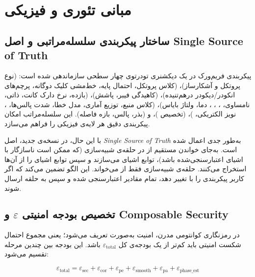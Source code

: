 \section{مبانی تئوری و فیزیکی}

\subsection{ساختار پیکربندی سلسله‌مراتبی و اصل Single Source of Truth}

پیکربندی فریم‌ورک در یک دیکشنری تودرتوی چهار سطحی سازماندهی شده است:  (نوع پروتکل و آشکارساز)،  (کلاس پروتکل، احتمال پایه، خط‌مشی کلیک دوگانه، پرچم‌های انکودر/دیکودر درهم‌تنیده)،  (کاهیدگی فیبر، پاشش)،  (بازده، نرخ دارک کانت،  ذاتی، نامساوی، ، ، ، دما، ولتاژ بایاس)،  (کلاس منبع، توزیع آماری، مدل خطا، شدت پالس‌ها، ، نویز الکتریکی، )،  (تخصیص )، و  (بذر،  پالس، بازه فاصله). این سلسله‌مراتب امکان پیکربندی دقیق هر لایه‌ی فیزیکی را فراهم می‌سازد.

با این حال، در نسخه‌ی جدید، اصل \emph{Single Source of Truth} به‌طور جدی اعمال شده است. به‌جای خواندن مستقیم از  در حلقه‌ی شبیه‌سازی (که ممکن است ناسازگار با اشیای اعتبارسنجی‌شده باشد)، توابع  اشیای  می‌سازند و سپس توابع  اشیای   را از آن‌ها استخراج می‌کنند. حلقه‌ی شبیه‌سازی فقط از  می‌خواند. این الگو تضمین می‌کند که اگر کاربر پیکربندی را با  تغییر دهد، تمام مقادیر اعتبارسنجی شده و سپس به حلقه ارسال شوند.

\subsection{تخصیص بودجه امنیتی $\varepsilon$ و Composable Security}

در رمزنگاری کوانتومی مدرن، امنیت به‌صورت  تعریف می‌شود؛ یعنی مجموع احتمال شکست امنیتی باید کم‌تر از یک بودجه‌ی کل $\varepsilon_{\text{total}}$ باشد. این بودجه بین چندین مرحله تقسیم می‌شود:

\begin{equation}
	\varepsilon_{\text{total}} = \varepsilon_{\text{sec}} + \varepsilon_{\text{cor}} + \varepsilon_{\text{pe}} + \varepsilon_{\text{smooth}} + \varepsilon_{\text{pa}} + \varepsilon_{\text{phase\_est}}
\end{equation}

